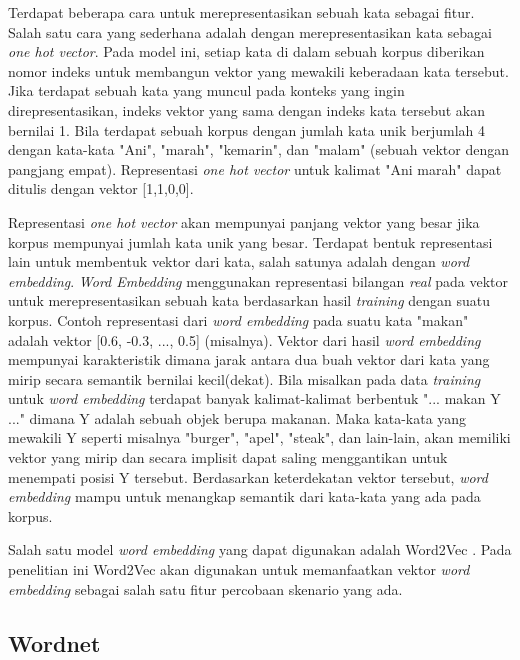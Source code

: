Terdapat beberapa cara untuk merepresentasikan sebuah kata sebagai fitur. Salah satu cara yang sederhana adalah dengan merepresentasikan kata sebagai \textit{one hot vector}. Pada model ini, setiap kata di dalam sebuah korpus diberikan nomor indeks untuk membangun vektor yang mewakili keberadaan kata tersebut. Jika terdapat sebuah kata yang muncul pada konteks yang ingin direpresentasikan, indeks vektor yang sama dengan indeks kata tersebut akan bernilai 1. Bila terdapat sebuah korpus dengan jumlah kata unik berjumlah 4 dengan kata-kata "Ani", "marah", "kemarin", dan "malam" (sebuah vektor dengan pangjang empat). Representasi \textit{one hot vector} untuk kalimat "Ani marah" dapat ditulis dengan vektor [1,1,0,0].

Representasi \textit{one hot vector} akan mempunyai panjang vektor yang besar jika korpus mempunyai jumlah kata unik yang besar. Terdapat bentuk representasi lain untuk membentuk vektor dari kata, salah satunya adalah dengan \textit{word embedding}. \textit{Word Embedding} menggunakan representasi bilangan \textit{real} pada vektor untuk merepresentasikan sebuah kata berdasarkan hasil \textit{training} dengan suatu korpus. Contoh representasi dari \textit{word embedding} pada suatu kata "makan" adalah vektor [0.6, -0.3, ..., 0.5] (misalnya). Vektor dari hasil \textit{word embedding} mempunyai karakteristik dimana jarak antara dua buah vektor dari kata yang mirip secara semantik bernilai kecil(dekat). Bila misalkan pada data \textit{training} untuk \textit{word embedding} terdapat banyak kalimat-kalimat berbentuk "... makan Y ..." dimana Y adalah sebuah objek berupa makanan. Maka kata-kata yang mewakili Y seperti misalnya "burger", "apel", "steak", dan lain-lain, akan memiliki vektor yang mirip dan secara implisit dapat saling menggantikan untuk menempati posisi Y tersebut. Berdasarkan keterdekatan vektor tersebut, \textit{word embedding} mampu untuk menangkap semantik dari kata-kata yang ada pada korpus.

Salah satu model \textit{word embedding} yang dapat digunakan adalah Word2Vec \citep{mikolov2013distributed}. Pada penelitian ini Word2Vec akan digunakan untuk memanfaatkan vektor \textit{word embedding} sebagai salah satu fitur percobaan skenario yang ada. 

\subsection{Wordnet}

